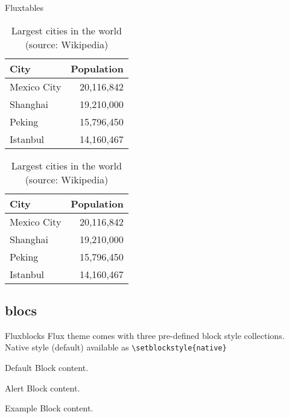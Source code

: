 \documentclass{beamer}
\begin{document}
\begin{frame}{Flux}{tables}
  \begin{table}
    \caption{Largest cities in the world (source: Wikipedia)}
    \begin{tabular}{@{} lr @{}}
      \toprule
      City & Population\\
      \midrule
      Mexico City & 20,116,842\\
      Shanghai & 19,210,000\\
      Peking & 15,796,450\\
      Istanbul & 14,160,467\\
      \bottomrule
    \end{tabular}
    \hspace*{1cm}
        \setlength\extrarowheight{3pt}
    \begin{tabular}{|lr|}
      \hline
      \rowcolor{primaryLight}\color{background}City & \color{background}Population\\
      \hline
      Mexico City & 20,116,842\\
      Shanghai & 19,210,000\\
      Peking & 15,796,450\\
      Istanbul & 14,160,467\\
      \hline
    \end{tabular}
\end{table}
\end{frame}

\subsection{blocs}

\begin{frame}[fragile]{Flux}{blocks}
  		Flux theme comes with three pre-defined block style collections.\\
  		Native style (default) available as \verb+\setblockstyle{native}+\\[0.5cm]
  
   \centering
	\begin{minipage}[b]{0.5\textwidth}

	  \begin{block}{Default}
        Block content.
      \end{block}

      \begin{alertblock}{Alert}
        Block content.
      \end{alertblock}

      \begin{exampleblock}{Example}
        Block content.
      \end{exampleblock}      
      
	\end{minipage}
	
\end{frame}
\end{document}
